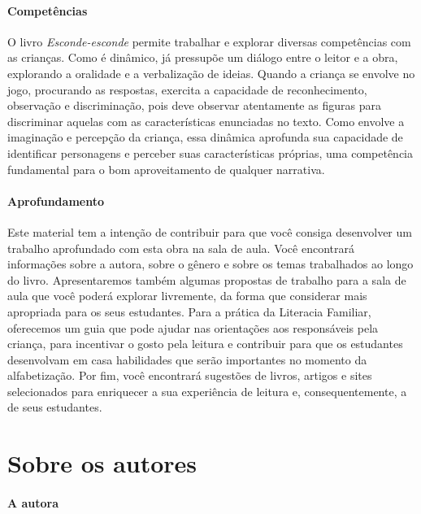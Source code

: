 \documentclass[11pt]{extarticle}
\begin{document}
\paragraph{Competências}
O livro \textit{Esconde-esconde} permite trabalhar e explorar diversas competências com as crianças. Como é dinâmico, já pressupõe um diálogo entre o leitor e a obra, explorando a oralidade e a verbalização de ideias. Quando a criança se envolve no jogo, procurando as respostas, exercita a capacidade de reconhecimento, observação e discriminação, pois deve observar atentamente as figuras para discriminar aquelas com as características enunciadas no texto. Como envolve a imaginação e percepção da criança, essa dinâmica aprofunda sua capacidade de identificar personagens e perceber suas características próprias, uma competência fundamental para o bom aproveitamento de qualquer narrativa.


\paragraph{Aprofundamento} Este material tem a 
intenção de contribuir para que você consiga desenvolver um trabalho aprofundado 
com esta obra na sala de aula. Você encontrará informações sobre a autora, sobre 
o gênero e sobre os temas trabalhados ao longo do livro. Apresentaremos também 
algumas propostas de trabalho para a sala de aula que você poderá explorar livremente, 
da forma que considerar mais apropriada para os seus estudantes. Para a prática 
da Literacia Familiar, oferecemos um guia que pode ajudar nas orientações aos 
responsáveis pela criança, para incentivar o gosto pela leitura e contribuir para 
que os estudantes desenvolvam em casa habilidades que serão importantes no momento 
da alfabetização. Por fim, você encontrará sugestões de livros, artigos e sites 
selecionados para enriquecer a sua experiência de leitura e, 
consequentemente, a de seus estudantes.



\section{Sobre os autores}

\paragraph{A autora} 

\end{document}
